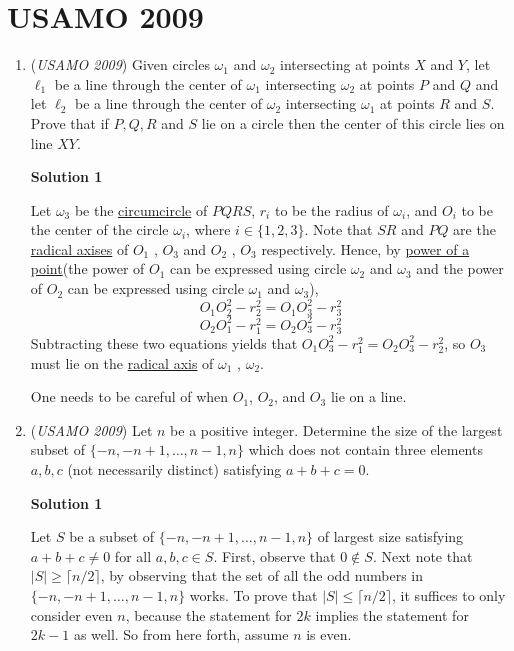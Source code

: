 \section{USAMO 2009}
        \begin{enumerate}
        	\item (\textit{USAMO 2009}) Given circles $\omega_1$ and $\omega_2$ intersecting at points $X$ and $Y$, let $\ell_1$ be a line through the center of $\omega_1$ intersecting $\omega_2$ at points $P$ and $Q$ and let $\ell_2$ be a line through the center of $\omega_2$ intersecting $\omega_1$ at points $R$ and $S$.  Prove that if $P, Q, R$ and $S$ lie on a circle then the center of this circle lies on line $XY$.


 



\textbf{Solution 1}

Let $\omega_3$ be the \href{https://artofproblemsolving.com/wiki/index.php?title=Circumcircle}{circumcircle} of $PQRS$, $r_i$ to be the radius of $\omega_i$, and $O_i$ to be the center of the circle $\omega_i$, where $i \in \{1,2,3\}$. Note that $SR$ and $PQ$ are the \href{https://artofproblemsolving.com/wiki/index.php?title=Radical\_axis}{radical axises} of $O_1$ , $O_3$ and $O_2$ , $O_3$ respectively. Hence, by \href{https://artofproblemsolving.com/wiki/index.php?title=Power\_of\_a\_point}{power of a point}(the power of $O_1$ can be expressed using circle $\omega_2$ and $\omega_3$ and the power of $O_2$ can be expressed using circle $\omega_1$ and $\omega_3$),
 \[O_1O_2^2 - r_2^2 = O_1O_3^2 - r_3^2\]
 \[O_2O_1^2 - r_1^2 = O_2O_3^2 - r_3^2\]Subtracting these two equations yields that $O_1O_3^2 - r_1^2 = O_2O_3^2 - r_2^2$, so $O_3$ must lie on the \href{https://artofproblemsolving.com/wiki/index.php?title=Radical\_axis}{radical axis} of $\omega_1$ , $\omega_2$.

 One needs to be careful of when $O_1$, $O_2$, and $O_3$ lie on a line. 

 


	\item (\textit{USAMO 2009}) Let $n$ be a positive integer.  Determine the size of the largest subset of $\{ - n, - n + 1, \ldots , n - 1, n\}$ which does not contain three elements $a, b, c$ (not necessarily distinct) satisfying $a + b + c = 0$.


 



\textbf{Solution 1}

Let $S$ be a subset of $\{-n,-n+1,\dots,n-1,n\}$ of largest size satisfying $a+b+c\neq 0$ for all $a,b,c\in S$. First, observe that $0\notin S$. Next note that $|S|\geq \lceil n/2\rceil$, by observing that the set of all the odd numbers in $\{-n,-n+1,\dots,n-1,n\}$ works. To prove that $|S|\leq \lceil n/2\rceil$, it suffices to only consider even $n$, because the statement for $2k$ implies the statement for $2k-1$ as well. So from here forth, assume $n$ is even.


\end{enumerate}
